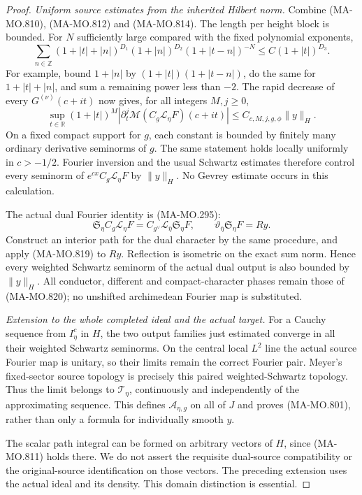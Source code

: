 \begin{proof}
\emph{Uniform source estimates from the inherited Hilbert norm.}
Combine (MA-MO.810), (MA-MO.812) and
(MA-MO.814). The length per height block is bounded.
For \(N\) sufficiently large compared with the fixed
polynomial exponents,
\[
 \sum_{n\in\mathbb Z}
  (1+|t|+|n|)^{D_1}(1+|n|)^{D_2}
        (1+|t-n|)^{-N}
                \le C(1+|t|)^{D_3}.
 \tag{MA-MO.818}
\]
For example, bound \(1+|n|\) by
\((1+|t|)(1+|t-n|)\), do the same for
\(1+|t|+|n|\), and sum a remaining power
less than \(-2\).
The rapid decrease of every \(G^{(\nu)}(c+it)\)
now gives, for all integers \(M,j\ge0\),
\[
 \sup_{t\in\mathbb R}(1+|t|)^M
  \left|\partial_t^j
        \mathcal M(C_g\mathcal L_\eta F)(c+it)\right|
          \le C_{c,M,j,g,\phi}\|y\|_H .
 \tag{MA-MO.819}
\]
On a fixed compact support for \(g\), each constant
is bounded by finitely many ordinary derivative
seminorms of \(g\). The same statement holds locally
uniformly in \(c>-1/2\).
Fourier inversion and the usual Schwartz estimates
therefore control every seminorm of
\(e^{cx}C_g\mathcal L_\eta F\) by \(\|y\|_H\).
No Gevrey estimate occurs in this calculation.

The actual dual Fourier identity is (MA-MO.295):
\[
 \mathfrak S_\eta C_g\mathcal L_\eta F
      =C_{g^\vee}\mathcal L_{\bar\eta}\mathfrak S_\eta F,
 \qquad
       \vartheta_{\bar\eta}\mathfrak S_\eta F=Ry .
 \tag{MA-MO.820}
\]
Construct an interior path for the dual character
by the same procedure, and apply (MA-MO.819) to
\(Ry\). Reflection is isometric on the exact sum
norm. Hence every weighted Schwartz seminorm of
the actual dual output is also bounded by \(\|y\|_H\).
All conductor, different and compact-character phases
remain those of (MA-MO.820); no unshifted archimedean
Fourier map is substituted.

\emph{Extension to the whole completed ideal and the actual target.}
For a Cauchy sequence from \(I_\eta^c\) in \(H\),
the two output families just estimated converge in
all their weighted Schwartz seminorms. On the central
local \(L^2\) line the actual source Fourier map is
unitary, so their limits remain the correct Fourier
pair. Meyer's fixed-sector source topology is precisely
this paired weighted-Schwartz topology. Thus the
limit belongs to \(\mathcal T_\eta\), continuously
and independently of the approximating sequence.
This defines \(\mathcal A_{\eta,g}\) on all of \(J\)
and proves (MA-MO.801), rather than only a formula
for individually smooth \(y\).

The scalar path integral can be formed on arbitrary
vectors of \(H\), since (MA-MO.811) holds there.
We do not assert the requisite dual-source compatibility
or the original-source identification on those vectors.
The preceding extension uses the actual ideal and
its density. This domain distinction is essential.


\end{proof}
